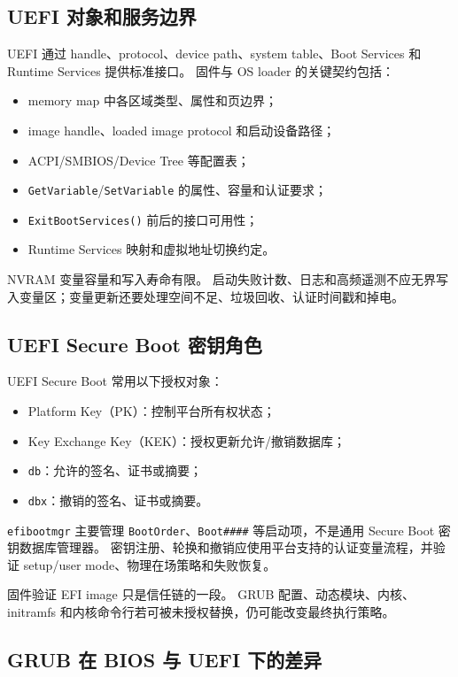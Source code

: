 \subsection{UEFI 对象和服务边界}

UEFI 通过 handle、protocol、device path、system table、Boot Services 和 Runtime Services 提供标准接口\cite{uefi-spec}。
固件与 OS loader 的关键契约包括：

\begin{itemize}
  \item memory map 中各区域类型、属性和页边界；
  \item image handle、loaded image protocol 和启动设备路径；
  \item ACPI/SMBIOS/Device Tree 等配置表；
  \item \texttt{GetVariable}/\texttt{SetVariable} 的属性、容量和认证要求；
  \item \texttt{ExitBootServices()} 前后的接口可用性；
  \item Runtime Services 映射和虚拟地址切换约定。
\end{itemize}

NVRAM 变量容量和写入寿命有限。
启动失败计数、日志和高频遥测不应无界写入变量区；变量更新还要处理空间不足、垃圾回收、认证时间戳和掉电。

\subsection{UEFI Secure Boot 密钥角色}

UEFI Secure Boot 常用以下授权对象：

\begin{itemize}
  \item Platform Key（PK）：控制平台所有权状态；
  \item Key Exchange Key（KEK）：授权更新允许/撤销数据库；
  \item \texttt{db}：允许的签名、证书或摘要；
  \item \texttt{dbx}：撤销的签名、证书或摘要。
\end{itemize}

\texttt{efibootmgr} 主要管理 \texttt{BootOrder}、\texttt{Boot\#\#\#\#} 等启动项，不是通用 Secure Boot 密钥数据库管理器。
密钥注册、轮换和撤销应使用平台支持的认证变量流程，并验证 setup/user mode、物理在场策略和失败恢复。

固件验证 EFI image 只是信任链的一段。
GRUB 配置、动态模块、内核、initramfs 和内核命令行若可被未授权替换，仍可能改变最终执行策略。

\subsection{GRUB 在 BIOS 与 UEFI 下的差异}

